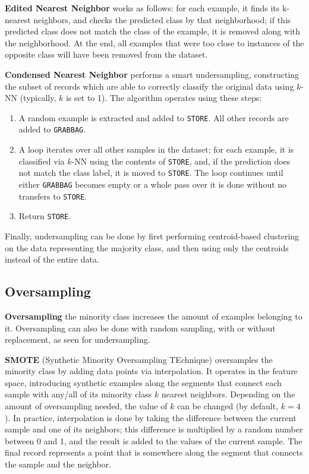 \textbf{Edited Nearest Neighbor} works as follows: for each example, it finds its k-nearest neighbors, and checks the predicted class by that neighborhood; if this predicted class does not match the class of the example, it is removed along with the neighborhood. At the end, all examples that were too close to instances of the opposite class will have been removed from the dataset.

\textbf{Condensed Nearest Neighbor} performs a smart undersampling, constructing the subset of records which are able to correctly classify the original data using $k$-NN (typically, $k$ is set to 1). The algorithm operates using these steps:
\begin{enumerate}
    \item A random example is extracted and added to \texttt{STORE}. All other records are added to \texttt{GRABBAG}.
    \item A loop iterates over all other samples in the dataset; for each example, it is classified via $k$-NN using the contents of \texttt{STORE}, and, if the prediction does not match the class label, it is moved to \texttt{STORE}. The loop continues until either \texttt{GRABBAG} becomes empty or a whole pass over it is done without no transfers to \texttt{STORE}.
    \item Return \texttt{STORE}.
\end{enumerate}

Finally, undersampling can be done by first performing centroid-based clustering on the data representing the majority class, and then using only the centroids instead of the entire data.

\subsection{Oversampling}

\textbf{Oversampling} the minority class increases the amount of examples belonging to it. Oversampling can also be done with random sampling, with or without replacement, as seen for undersampling.

\textbf{SMOTE} (Synthetic Minority Oversampling TEchnique) oversamples the minority class by adding data points via interpolation. It operates in the feature space, introducing synthetic examples along the segments that connect each sample with any/all of its minority class $k$ nearest neighbors. Depending on the amount of oversampling needed, the value of $k$ can be changed (by default, $k=4$). In practice, interpolation is done by taking the difference between the current sample and one of its neighbors; this difference is multiplied by a random number between 0 and 1, and the result is added to the values of the current sample. The final record represents a point that is somewhere along the segment that connects the sample and the neighbor.


